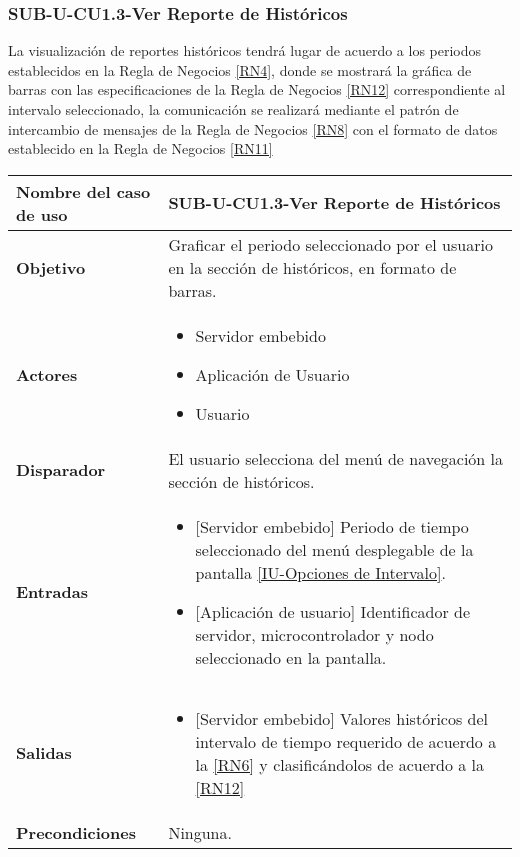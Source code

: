 \subsubsection{SUB-U-CU1.3-Ver Reporte de Históricos}\label{SUB-U-CU1.3}
La visualización de reportes históricos tendrá lugar de acuerdo a los periodos establecidos en la Regla de Negocios \ref{RN4}, donde se mostrará la gráfica de barras con las especificaciones de la Regla de Negocios \ref{RN12} correspondiente al intervalo seleccionado, la comunicación se realizará mediante el patrón de intercambio de mensajes de la Regla de Negocios \ref{RN8} con el formato de datos establecido en la Regla de Negocios \ref{RN11}

\begin{longtable}{|J{5cm}|J{10.3cm}|}
	\hline
	\textbf{Nombre del caso de uso} &
		SUB-U-CU1.3-Ver Reporte de Históricos \\ \hline
	\textbf{Objetivo} &
		Graficar el periodo seleccionado por el usuario en la sección de históricos, en formato de barras. \\ \hline
	\textbf{Actores} &
		\begin{itemize}
			\item Servidor embebido
			\item Aplicación de Usuario
			\item Usuario 
		\end{itemize} \\ \hline
	\textbf{Disparador} & 
		El usuario selecciona del menú de navegación la sección de históricos. \\ \hline 
	\textbf{Entradas} & 
		\begin{itemize}
			\item{[Servidor embebido]} Periodo de tiempo seleccionado del menú desplegable de la pantalla \hyperref[fig:Opciones de Intervalo]{[IU-Opciones de Intervalo]}.
			\item{[Aplicación de usuario]} Identificador de servidor, microcontrolador y nodo seleccionado en la pantalla.
		\end{itemize}\\ \hline 
	\textbf{Salidas} & 
		\begin{itemize}
			\item{[Servidor embebido]} Valores históricos del intervalo de tiempo requerido de acuerdo a la \ref{RN6} y clasificándolos de acuerdo a la \ref{RN12}
		\end{itemize} \\ \hline
	\textbf{Precondiciones} &
		Ninguna.\\ \hline

\end{longtable}
